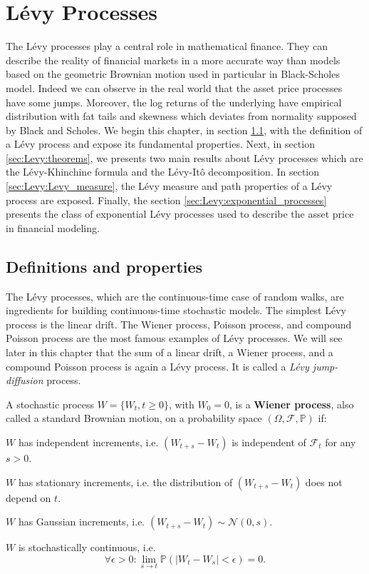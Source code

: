 \chapter{L\'evy Processes}
\label{sec:Levy}


The L\'evy processes play a central role in mathematical finance. They can describe the reality of financial markets in a more accurate way than models based on the geometric Brownian motion used in particular in Black-Scholes model. Indeed we can observe in the real world that the asset price processes have some jumps. Moreover, the log returns of the underlying have empirical distribution with fat tails and skewness which deviates from normality supposed by Black and Scholes. We begin this chapter, in section \ref{sec:Levy:definitions}, with the definition of a L\'evy process and expose its fundamental properties. Next, in section \ref{sec:Levy:theorems}, we presents two main results about L\'evy processes which are the L\'evy-Khinchine formula and the L\'evy-Itô decomposition. In section \ref{sec:Levy:Levy_measure}, the L\'evy measure and  path properties of a L\'evy process are exposed. Finally, the section \ref{sec:Levy:exponential_processes} presents the class of exponential L\'evy processes used to describe the asset price in financial modeling.

\section{Definitions and properties}
\label{sec:Levy:definitions}
The L\'evy processes, which are the continuous-time case of random walks, are ingredients for building continuous-time stochastic models. The simplest L\'evy process is the linear drift. The Wiener process, Poisson process, and compound Poisson process are the most famous examples of L\'evy processes. We will see later in this chapter that the sum of a linear drift, a Wiener process, and a compound Poisson process is again a L\'evy process. It is called a \textit{L\'evy jump-diffusion} process.

\begin{defn}\label{def:wiener}
A stochastic process $W = \{W_t,t\geq 0\}$, with $W_0=0$, is a \textbf{Wiener process}, also called a standard Brownian motion, on a probability space $(\Omega,\mathcal{F},\mathbb{P})$ if:
\begin{my_list_num}
\item $W$ has independent increments, i.e. $(W_{t+s}-W_t)$ is independent of $\mathcal{F}_t$ for any $s>0$.
\item $W$ has stationary increments, i.e. the distribution of $(W_{t+s}-W_t)$ does not depend on $t$.
\item $W$ has Gaussian increments, i.e. $(W_{t+s}-W_t) \sim \mathcal{N}(0,s)$.
\item $W$ is stochastically continuous, i.e. $$\forall \epsilon>0: \lim_{s \to t}\mathbb{P}(|W_t-W_s|<\epsilon)=0.$$
\end{my_list_num}
\end{defn}

